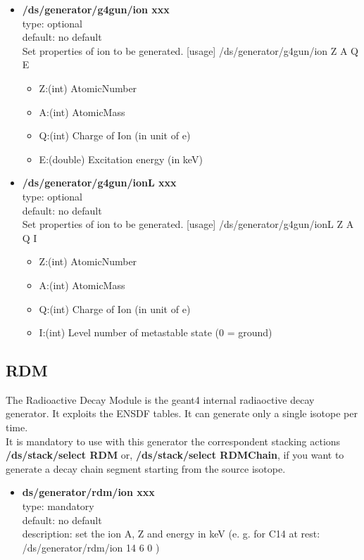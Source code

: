 \documentclass[twocolumn, 10pt]{article}
\begin{document}
\begin{itemize}

\item \textbf{/ds/generator/g4gun/ion xxx}\\ 
type: optional \\
default: no default\\
Set properties of ion to be generated. [usage] /ds/generator/g4gun/ion Z A Q E
\begin{itemize}
\item	 Z:(int) AtomicNumber 
\item	 A:(int) AtomicMass 
\item	 Q:(int) Charge of Ion (in unit of e) 
\item	 E:(double) Excitation energy (in keV) 
\end{itemize}

\item \textbf{/ds/generator/g4gun/ionL xxx}\\ 
type: optional \\
default: no default\\
Set properties of ion to be generated. [usage] /ds/generator/g4gun/ionL Z A Q I
\begin{itemize}
\item	 Z:(int) AtomicNumber 
\item	 A:(int) AtomicMass 
\item	 Q:(int) Charge of Ion (in unit of e) 
\item	 I:(int) Level number of metastable state (0 = ground)
\end{itemize}

\end{itemize}


\subsection{RDM}
The Radioactive Decay Module is the geant4 internal radiaoctive decay generator. It exploits the ENSDF tables. 
It can generate only a single isotope per time. \\
It is mandatory to use with this generator the correspondent stacking actions  \textbf{/ds/stack/select RDM} or,  \textbf{/ds/stack/select RDMChain}, if you want to generate a decay chain segment starting from the source isotope. \\

\begin{itemize}

\item \textbf{ds/generator/rdm/ion xxx}\\ 
type: mandatory \\
default: no default\\
description: set the ion A, Z and energy in keV (e. g. for C14 at rest: /ds/generator/rdm/ion 14 6 0 ) \\

\end{itemize}
\end{document}
